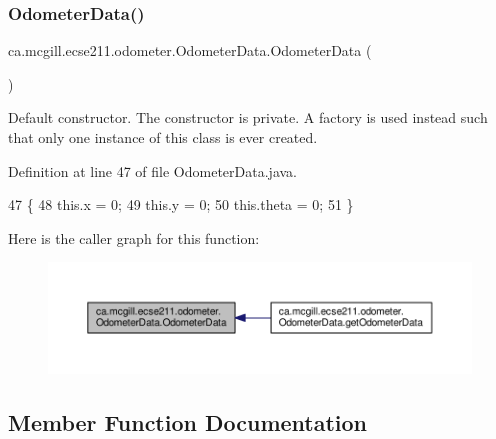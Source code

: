 \subsubsection{\texorpdfstring{Odometer\+Data()}{OdometerData()}}
{\footnotesize\ttfamily ca.\+mcgill.\+ecse211.\+odometer.\+Odometer\+Data.\+Odometer\+Data (\begin{DoxyParamCaption}{ }\end{DoxyParamCaption})\hspace{0.3cm}{\ttfamily [protected]}}

Default constructor. The constructor is private. A factory is used instead such that only one instance of this class is ever created. 

Definition at line 47 of file Odometer\+Data.\+java.


\begin{DoxyCode}
47                            \{
48     this.x = 0;
49     this.y = 0;
50     this.theta = 0;
51   \}
\end{DoxyCode}
Here is the caller graph for this function\+:\nopagebreak
\begin{figure}[H]
\begin{center}
\leavevmode
\includegraphics[width=350pt]{classca_1_1mcgill_1_1ecse211_1_1odometer_1_1_odometer_data_a91412854b75c41bf3af7c8892ec0fe87_icgraph}
\end{center}
\end{figure}


\subsection{Member Function Documentation}
\mbox{\label{classca_1_1mcgill_1_1ecse211_1_1odometer_1_1_odometer_data_afff2d760dd1f861b580f3eacef37f1cc}} 
